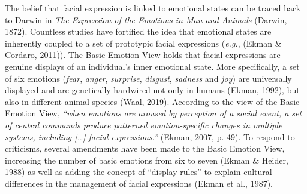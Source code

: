 \documentclass[man]{apa6}
\begin{document}
The belief that facial expression is linked to emotional states can be traced back to Darwin in \emph{The Expression of the Emotions in Man and Animals} (Darwin, 1872). Countless studies have fortified the idea that emotional states are inherently coupled to a set of prototypic facial expressions (\emph{e.g.}, (Ekman \& Cordaro, 2011)). The Basic Emotion View holds that facial expressions are genuine displays of an individual's inner emotional state. More specifically, a set of six emotions (\emph{fear}, \emph{anger}, \emph{surprise}, \emph{disgust}, \emph{sadness} and \emph{joy}) are universally displayed and are genetically hardwired not only in humans (Ekman, 1992), but also in different animal species (Waal, 2019). According to the view of the Basic Emotion View, \emph{\enquote{when emotions are aroused by perception of a social event, a set of central commands produce patterned emotion-specific changes in multiple systems, including {[}\ldots{}{]} facial expressions.}} (Ekman, 2007, p. 49). To respond to criticisms, several amendments have been made to the Basic Emotion View, increasing the number of basic emotions from six to seven (Ekman \& Heider, 1988) as well as adding the concept of \enquote{display rules} to explain cultural differences in the management of facial expressions (Ekman et al., 1987).
\end{document}
